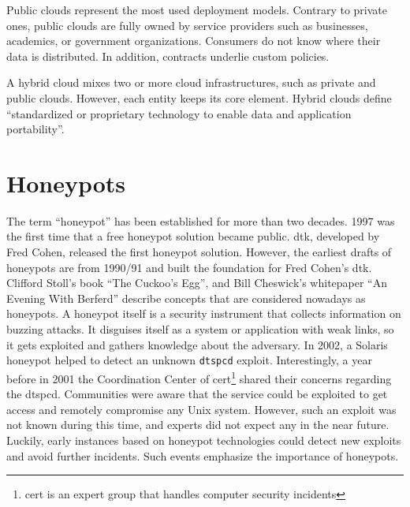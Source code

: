 Public clouds represent the most used deployment models.
Contrary to private ones, public clouds are fully owned by service providers such as businesses, academics, or government organizations.
Consumers do not know where their data is distributed.
In addition, contracts underlie custom policies. \cite{Mell2011}

A hybrid cloud mixes two or more cloud infrastructures, such as private and public clouds.
However, each entity keeps its core element.
Hybrid clouds define \enquote{standardized or proprietary technology to enable data and application portability}\cite{Mell2011}.

\section{Honeypots}

The term \enquote{honeypot} has been established for more than two decades.
1997 was the first time that a free honeypot solution became public.
\ac{dtk}, developed by Fred Cohen, released the first honeypot solution.
However, the earliest drafts of honeypots are from 1990/91 and built the foundation for Fred Cohen's \ac*{dtk}.
Clifford Stoll's book \enquote{The Cuckoo's Egg}\cite{stroll2000}, and Bill Cheswick's whitepaper \enquote{An Evening With Berferd}\cite{Cheswick92} describe concepts that are considered nowadays as honeypots.\cite{Spitzner2003}
A honeypot itself is a security instrument that collects information on buzzing attacks.
It disguises itself as a system or application with weak links, so it gets exploited and gathers knowledge about the adversary.
In 2002, a Solaris honeypot helped to detect an unknown \verb|dtspcd| exploit.
Interestingly, a year before in 2001 the Coordination Center of \acs{cert}\footnote{\acl{cert} is an expert group that handles computer security incidents\cite{cert2021}} shared their concerns regarding the dtspcd.
Communities were aware that the service could be exploited to get access and remotely compromise any Unix system.
However, such an exploit was not known during this time, and experts did not expect any in the near future.
Luckily, early instances based on honeypot technologies could detect new exploits and avoid further incidents.
Such events emphasize the importance of honeypots.

